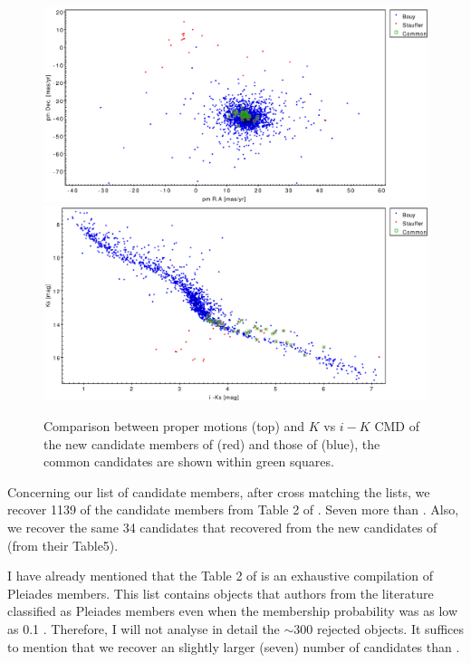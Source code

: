 \begin{figure}[htbp]
\begin{center}
\includegraphics[width=\textwidth]{./background/Figures/Stauffer5Bouy_PM.pdf}
\includegraphics[width=\textwidth]{./background/Figures/Stauffer5Bouy_CMD.pdf}
\caption{Comparison between proper motions (top) and $K$ vs $i-K$ CMD of the new candidate members of \citet{Stauffer2007} (red) and those of \citet{Bouy2015}(blue), the common candidates are shown within green squares. }
\label{fig:Stauffer2}
\end{center}
\end{figure}
 
Concerning our list of candidate members, after cross matching the lists, we recover 1139 of the candidate members from Table 2 of  \citet{Stauffer2007}. Seven more than \citet{Bouy2015}. Also, we recover the same 34 candidates that \citet{Bouy2015} recovered from the new candidates of \citet{Stauffer2007} (from their Table5). 

I have already mentioned that the Table 2 of \citet{Stauffer2007} is an exhaustive compilation of Pleiades members. This list contains objects that authors from the literature classified as Pleiades members even when the membership probability was as low as 0.1 \citep{Stauffer2007}. Therefore, I will not analyse in detail the $\sim 300$ rejected objects. It suffices to mention that we recover an slightly larger (seven) number of candidates than \citet{Bouy2015}.

